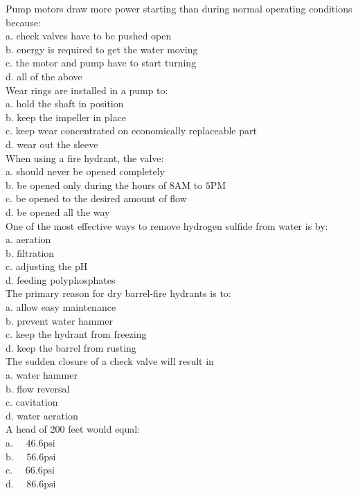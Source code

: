 Pump motors draw more power starting than during normal operating conditions because:\\
a. check valves have to be pushed open\\
b. energy is required to get the water moving\\
c. the motor and pump have to start turning\\
d. all of the above\\

Wear rings are installed in a pump to:\\
a. hold the shaft in position\\
b. keep the impeller in place\\
c. keep wear concentrated on economically replaceable part\\
d. wear out the sleeve\\

When using a fire hydrant, the valve:\\
a. should never be opened completely\\
b. be opened only during the hours of $8 \mathrm{AM}$ to $5 \mathrm{PM}$\\
c. be opened to the desired amount of flow\\
d. be opened all the way\\

One of the most effective ways to remove hydrogen sulfide from water is by:\\
a. aeration\\
b. filtration\\
c. adjusting the $\mathrm{pH}$\\
d. feeding polyphosphates\\

The primary reason for dry barrel-fire hydrants is to:\\
a. allow easy maintenance\\
b. prevent water hammer\\
c. keep the hydrant from freezing\\
d. keep the barrel from rusting \\

The sudden closure of a check valve will result in\\
a. water hammer\\
b. flow reversal\\
c. cavitation\\
d. water aeration\\

A head of 200 feet would equal:\\
a. $\quad 46.6 \mathrm{psi}$\\
b. $\quad 56.6 \mathrm{psi}$\\
c. $\quad 66.6 \mathrm{psi}$\\
d. $\quad 86.6 \mathrm{psi}$\\

